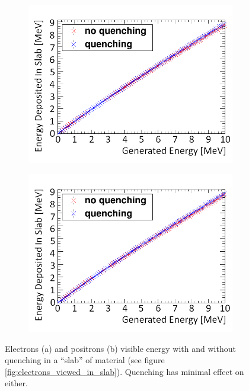 \begin{figure}[!h]
\centering
\begin{subfigure}{.45\textwidth}
  \centering
  \includegraphics[width=\linewidth]{Chapter4/Figs/Raster/quenchedElectronsNew.png}
  \captionsetup{width=.9\linewidth}
  \caption{}
  \label{subFig:electron_quenched_and_not}
\end{subfigure}%
\begin{subfigure}{.45\textwidth}
  \centering
  \includegraphics[width=\linewidth]{Chapter4/Figs/Raster/quenchedPositronsNew.png}
  \captionsetup{width=.9\linewidth}
  \caption{}
  \label{subFig:positron_quenched_and_not}
\end{subfigure}
\caption{Electrons (a) and positrons (b) visible energy with and without quenching in a ``slab'' of material (see figure \ref{fig:electrons_viewed_in_slab}). Quenching has minimal effect on either. }
\label{fig:electron_positron_quenched_and_not}
\end{figure}

